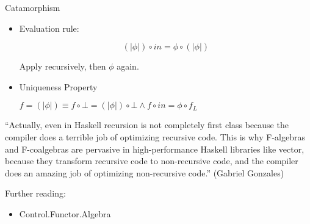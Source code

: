 \documentclass{beamer}
\begin{document}
\begin{frame}[fragile]{Catamorphism}
\begin{itemize}
\item Evaluation rule:

$$(\!| \phi |\!)\circ in = \phi \circ (\!| \phi |\!)$$

Apply recursively, then $\phi$ again.

\item Uniqueness Property

$f = (\!| \phi |\!) \equiv  f \circ \bot = ( \!| \phi |\!) \circ \bot \land f \circ in = \phi \circ f_L$
\end{itemize}

\end{frame}
\begin{frame}
``Actually, even in Haskell recursion is not completely first class because the compiler does a terrible job of optimizing recursive code. This is why F-algebras and F-coalgebras are pervasive in high-performance Haskell libraries like vector, because they transform recursive code to non-recursive code, and the compiler does an amazing job of optimizing non-recursive code.'' (Gabriel Gonzales)

\end{frame}
\begin{frame}
Further reading:
\begin{itemize}
\item Control.Functor.Algebra
\end{itemize}
\end{frame}
\end{document}
